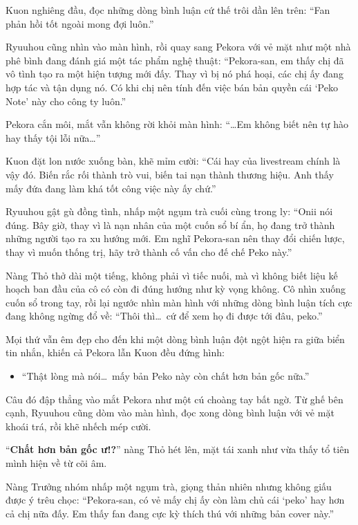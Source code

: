 \documentclass[../main.tex]{subfiles}
\begin{document}

Kuon nghiêng đầu, đọc những dòng bình luận cứ thế trôi dần lên trên: ``Fan phản hồi tốt ngoài mong đợi luôn.''

Ryuuhou cũng nhìn vào màn hình, rồi quay sang Pekora với vẻ mặt như một nhà phê bình đang đánh giá một tác phẩm nghệ thuật: ``Pekora-san, em thấy chị đã vô tình tạo ra một hiện tượng mới đấy. Thay vì bị nó phá hoại, các chị ấy đang hợp tác và tận dụng nó. Có khi chị nên tính đến việc bán bản quyền cái `Peko Note' này cho công ty luôn.''

Pekora cắn môi, mắt vẫn không rời khỏi màn hình: ``\dots Em không biết nên tự hào hay thấy tội lỗi nữa\dots''

Kuon đặt lon nước xuống bàn, khẽ mỉm cười: ``Cái hay của livestream chính là vậy đó. Biến rắc rối thành trò vui, biến tai nạn thành thương hiệu. Anh thấy mấy đứa đang làm khá tốt công việc này ấy chứ.''

Ryuuhou gật gù đồng tình, nhấp một ngụm trà cuối cùng trong ly: ``Onii nói đúng. Bây giờ, thay vì là nạn nhân của một cuốn sổ bí ẩn, họ đang trở thành những người tạo ra xu hướng mới. Em nghĩ Pekora-san nên thay đổi chiến lược, thay vì muốn thống trị, hãy trở thành cố vấn cho đế chế Peko này.''

Nàng Thỏ thở dài một tiếng, không phải vì tiếc nuối, mà vì không biết liệu kế hoạch ban đầu của cô có còn đi đúng hướng như kỳ vọng không. Cô nhìn xuống cuốn sổ trong tay, rồi lại ngước nhìn màn hình với những dòng bình luận tích cực đang không ngừng đổ về: ``Thôi thì\dots\ cứ để xem họ đi được tới đâu, peko.''

Mọi thứ vẫn êm đẹp cho đến khi một dòng bình luận đột ngột hiện ra giữa biển tin nhắn, khiến cả Pekora lẫn Kuon đều đứng hình:

\begin{itemize}
  \item ``Thật lòng mà nói\dots\ mấy bản Peko này còn chất hơn bản gốc nữa.''
\end{itemize}

Câu đó đập thẳng vào mắt Pekora như một cú choàng tay bất ngờ. Từ ghế bên cạnh, Ryuuhou cũng dòm vào màn hình, đọc xong dòng bình luận với vẻ mặt khoái trá, rồi khẽ nhếch mép cười.

``\textbf{Chất hơn bản gốc ư!?}'' nàng Thỏ hét lên, mặt tái xanh như vừa thấy tổ tiên mình hiện về từ cõi âm.

Nàng Trưởng nhóm nhấp một ngụm trà, giọng thản nhiên nhưng không giấu được ý trêu chọc: ``Pekora-san, có vẻ mấy chị ấy còn làm chủ cái `peko' hay hơn cả chị nữa đấy. Em thấy fan đang cực kỳ thích thú với những bản cover này.''
\end{document}
